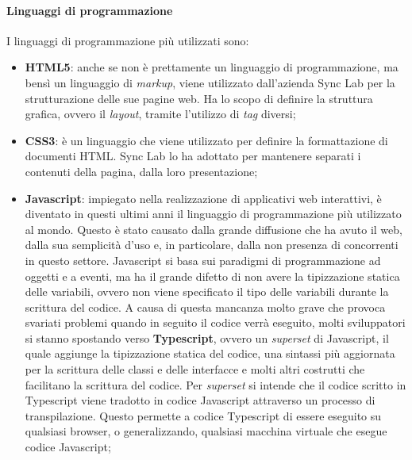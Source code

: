 \paragraph{Linguaggi di programmazione} 
I linguaggi di programmazione più utilizzati sono:
\begin{itemize}
  \item \textbf{HTML5}: anche se non è prettamente un linguaggio di programmazione, ma bensì un linguaggio di \textit{markup}, viene utilizzato dall'azienda Sync Lab per la strutturazione delle sue pagine web. Ha lo scopo di definire la struttura grafica, ovvero il \textit{layout}, tramite l'utilizzo di \textit{tag} diversi;
  
  \item \textbf{CSS3}: è un linguaggio che viene utilizzato per definire la formattazione di documenti HTML. Sync Lab lo ha adottato per mantenere separati i contenuti della pagina, dalla loro presentazione;

  \item \textbf{Javascript}: impiegato nella realizzazione di applicativi web interattivi, è diventato in questi ultimi anni il linguaggio di programmazione più utilizzato al mondo. Questo è stato causato dalla grande diffusione che ha avuto il web, dalla sua semplicità d'uso e, in particolare, dalla non presenza di concorrenti in questo settore. Javascript si basa sui paradigmi di programmazione ad oggetti e a eventi, ma ha il grande difetto di non avere la tipizzazione statica delle variabili, ovvero non viene specificato il tipo delle variabili durante la scrittura del codice. A causa di questa mancanza molto grave che provoca svariati problemi quando in seguito il codice verrà eseguito, molti sviluppatori si stanno spostando verso \textbf{Typescript}, ovvero un \textit{superset} di Javascript, il quale aggiunge la tipizzazione statica del codice, una sintassi più aggiornata per la scrittura delle classi e delle interfacce e molti altri costrutti che facilitano la scrittura del codice. Per \textit{superset} si intende che il codice scritto in Typescript viene tradotto in codice Javascript attraverso un processo di transpilazione. Questo permette a codice Typescript di essere eseguito su qualsiasi browser, o generalizzando, qualsiasi macchina virtuale che esegue codice Javascript;
  

\end{itemize}
